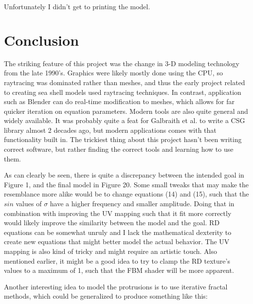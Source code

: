\documentclass[a4paper]{article}
\begin{document}
Unfortunately I didn't get to printing the model.

\section{Conclusion}

The striking feature of this project was the change in 3-D modeling technology from the late 1990's. Graphics were likely mostly done using the CPU, so raytracing was dominated rather than meshes, and thus the early project related to creating sea shell models used raytracing techniques. In contrast, application such as Blender can do real-time modification to meshes, which allows for far quicker iteration on equation parameters. Modern tools are also quite general and widely available. It was probably quite a feat for Galbraith et al. to write a CSG library almost 2 decades ago, but modern applications comes with that functionality built in. The trickiest thing about this project hasn't been writing correct software, but rather finding the correct tools and learning how to use them.

As can clearly be seen, there is quite a discrepancy between the intended goal in Figure 1, and the final model in Figure 20. Some small tweaks that may make the resemblance more alike would be to change equations (14) and (15), such that the $sin$ values of $\sigma$ have a higher frequency and smaller amplitude. Doing that in combination with improving the UV mapping such that it fit more correctly would likely improve the similarity between the model and the goal. RD equations can be somewhat unruly and I lack the mathematical dexterity to create new equations that might better model the actual behavior. The UV mapping is also kind of tricky and might require an artistic touch. Also mentioned earlier, it might be a good idea to try to clamp the RD texture's values to a maximum of 1, such that the FBM shader will be more apparent.

Another interesting idea to model the protrusions is to use iterative fractal methods, which could be generalized to produce something like this:
\end{document}
